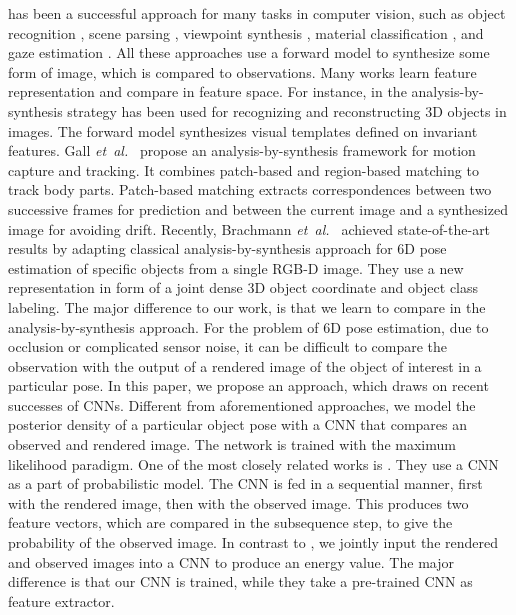 \documentclass[10pt,letterpaper]{article}
\newcommand{\etal}{\mbox{\emph{et al.\ }}}
\begin{document}
has been a successful approach for many tasks in computer vision, such as object recognition \cite{Hejrati_CVPR_2014}, scene parsing \cite{Isola_SceneCollaging_2013}, viewpoint synthesis \cite{Hejrati_CVPR_2014}, material classification \cite{weinmann_synthesized_2014}, and gaze estimation \cite{sugano_synthesis_2014}. 
All these approaches use a forward model to synthesize some form of image, which is compared to observations.
Many works learn feature representation and compare in feature space.
For instance, in \cite{Hejrati_CVPR_2014} the analysis-by-synthesis strategy has been used for recognizing and reconstructing 3D objects in images.  
The forward model synthesizes visual templates defined on invariant features. 
Gall \etal \cite{GallRS_2008} propose an analysis-by-synthesis framework for motion capture and tracking.
It combines patch-based and region-based matching to track body parts.
Patch-based matching extracts correspondences between two successive frames for prediction and between the current image and a synthesized image for avoiding drift.
Recently, Brachmann \etal \cite{brachmann2014} achieved state-of-the-art results by adapting classical analysis-by-synthesis approach for 6D pose estimation of specific objects from a single RGB-D image. They use a new representation in form of a joint dense 3D object coordinate and object class labeling.
The major difference to our work, is that we learn to compare in the analysis-by-synthesis approach.
For the problem of 6D pose estimation, due to occlusion or complicated sensor noise, it can be difficult to compare the observation with the output of a rendered image of the object of interest in a particular pose. In this paper, we propose an approach, which draws on recent successes of CNNs. 
Different from aforementioned approaches, we model the posterior density of a particular object pose with a CNN that compares an observed and rendered image. The network is trained with the maximum likelihood paradigm.
One of the most closely related works is \cite{Kulkarni_2014}. They use a CNN as a part of probabilistic model.
The CNN is fed in a sequential manner, first with the rendered image, then with the observed image.
This produces two feature vectors, which are compared in the subsequence step, to give the probability of the observed image.
In contrast to \cite{Kulkarni_2014}, we jointly input the rendered and observed images into a CNN to produce an energy value.
The major difference is that our CNN is trained, while they take a pre-trained CNN as feature extractor.
\end{document}
